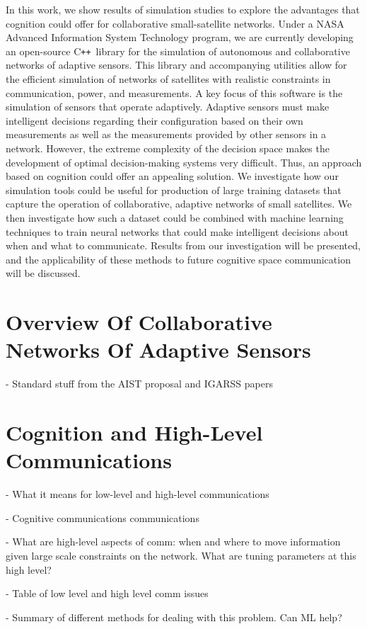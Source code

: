 \documentclass[conference]{IEEEtran}
\newcommand{\cpp}{C\texttt{++}~}
\begin{document}
In this work, we show results of simulation studies to explore the advantages
that cognition could offer for collaborative small-satellite networks.  Under a
NASA Advanced Information System Technology program, we are currently developing
an open-source \cpp library for the simulation of autonomous and collaborative
networks of adaptive sensors.  This library and accompanying utilities allow for
the efficient simulation of networks of satellites with realistic constraints in
communication, power, and measurements.  A key focus of this software is the
simulation of sensors that operate adaptively.  Adaptive sensors must make
intelligent decisions regarding their configuration based on their own
measurements as well as the measurements provided by other sensors in a network.
However, the extreme complexity of the decision space makes the development of
optimal decision-making systems very difficult.  Thus, an approach based on
cognition could offer an appealing solution.  We investigate how our simulation
tools could be useful for production of large training datasets that capture the
operation of collaborative, adaptive networks of small satellites.  We then
investigate how such a dataset could be combined with machine learning
techniques to train neural networks that could make intelligent decisions about
when and what to communicate.  Results from our investigation will be presented,
and the applicability of these methods to future cognitive space communication
will be discussed.

\section{Overview Of Collaborative Networks Of Adaptive Sensors}

{\color{red}
  - Standard stuff from the AIST proposal and IGARSS papers
}

\vspace{180pt}

\section{Cognition and High-Level Communications}

{\color{red}
  - What it means for low-level and high-level communications

  - Cognitive communications communications

  - What are high-level aspects of comm: when and where to move information
  given large scale constraints on the network. What are tuning parameters at
  this high level?

  - Table of low level and high level comm issues

  - Summary of different methods for dealing with this problem. Can ML help?
}
\vspace{80pt}
\end{document}
